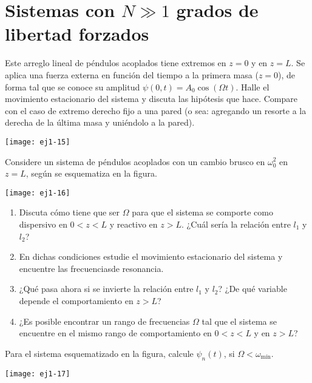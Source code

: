 \section*{Sistemas con \(N\gg 1\) grados de libertad forzados}

				
\item
\begin{minipage}[t][3.5cm]{0.6\textwidth}
Este arreglo lineal de péndulos acoplados tiene extremos en $z= 0$ y en $z= L$.
Se aplica una fuerza externa en función del tiempo a la primera masa ($z=0$), de forma tal que se conoce su amplitud $\psi(0,t)= A_0 \cos(\Omega t)$.
Halle el movimiento estacionario del sistema y discuta las hipótesis que hace.
Compare con el caso de extremo derecho fijo a una pared (o sea: agregando un resorte a la derecha de la última masa y uniéndolo a la pared). 
\end{minipage}
\begin{minipage}[c][0cm][t]{0.35\textwidth}
  \texttt{[image: ej1-15]}
\end{minipage}



\item
\begin{minipage}[t][3cm]{0.35\textwidth}
Considere un sistema de péndulos acoplados con un cambio brusco en $\omega_{0}^{2}$ en $z=L$, según se esquematiza en la figura.
\end{minipage}
\begin{minipage}[c][3cm][t]{0.6\textwidth}
  \texttt{[image: ej1-16]}
\end{minipage}
\begin{enumerate}
	\item Discuta cómo tiene que ser \(\Omega\) para que el sistema se comporte como dispersivo en \(0< z < L\) y reactivo en \(z > L\).
	¿Cuál sería la relación entre \(l_1\) y\(l_2\)?
	\item En dichas condiciones estudie el movimiento estacionario del sistema y encuentre las frecuenciasde resonancia.
	\item ¿Qué pasa ahora si se invierte la relación entre \(l_1\) y \(l_2\)?
	¿De qué variable depende el comportamiento en \(z > L\)?
	\item ¿Es posible encontrar un rango de frecuencias \(\Omega\) tal que el sistema se encuentre en el mismo rango de comportamiento en \(0< z < L\) y en \(z > L\)?
\end{enumerate}



\item
\begin{minipage}[t][3.5cm]{0.45\textwidth}
Para el sistema esquematizado en la figura, calcule $\psi_{n}(t)$, si $\Omega<\omega_\textrm{mín}$.
\end{minipage}
\begin{minipage}[c][2cm][t]{0.5\textwidth}
  \texttt{[image: ej1-17]}
\end{minipage}
